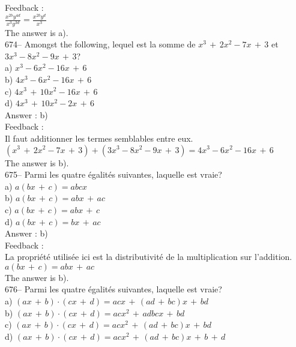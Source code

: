 \documentclass[letterpaper, 12pt]{article}
\begin{document}
Feedback : \\[2mm]
$\frac{x^{2b}y^{4d}}{x^{3}y^{3d}}=\frac{x^{2b}y^{d}}{x^{3}}$\\[2mm]
The answer is a).\\


674-- Amongst the following, lequel est la somme de
$x^{3}\,+\,2x^{2}-7x\,+\,3$ et $3x^{3}-8x^{2}-9x\,+\,3$?\\
a) $x^{3}-6x^{2}-16x\,+\,6$\\
b) $4x^{3}-6x^{2}-16x\,+\,6$\\
c) $4x^{3}\,+\,10x^{2}-16x\,+\,6$\\
d) $4x^{3}\,+\,10x^{2}-2x\,+\,6$\\

Answer : b)\\

Feedback : \\
Il faut additionner les termes semblables entre eux.\\
$\left( x^{3}\,+\,2x^{2}-7x\,+\,3\right)  + \left(
3x^{3}-8x^{2}-9x\,+\,3\right) =4x^{3}-6x^{2}-16x\,+\,6$\\
The answer is b).\\

675-- Parmi les quatre \'egalit\'es suivantes, laquelle est vraie?\\
a) $a\left( bx\,+\,c\right) =abcx$\\
b) $a\left( bx\,+\,c\right) =abx\,+\,ac$\\
c) $a\left( bx\,+\,c\right) =abx\,+\,c$\\
d) $a\left( bx\,+\,c\right) =bx\,+\,ac$\\

Answer : b)\\

Feedback : \\
La propri\'et\'e utilis\'ee ici est la distributivit\'e de la multiplication
sur l'addition.\\
$a\left( bx\,+\,c\right) =abx\,+\,ac$\\
The answer is b).\\

676-- Parmi les quatre \'egalit\'es suivantes, laquelle est vraie?\\
a) $\left( ax\,+\,b\right) \cdot\left( cx\,+\,d\right) =acx\,+\,\left(
ad\,+\,bc\right)x \,+\,bd$\\
b) $\left( ax\,+\,b\right) \cdot\left( cx\,+\,d\right) =acx^2\,+\,adbcx
\,+\,bd$\\
c) $\left( ax\,+\,b\right) \cdot\left( cx\,+\,d\right) =acx^2\,+\,\left(
ad\,+\,bc\right)x \,+\,bd$\\
d) $\left( ax\,+\,b\right) \cdot\left( cx\,+\,d\right) =acx^2\,+\,\left(
ad\,+\,bc\right)x \,+\,b\,+\,d$\\
\end{document}

